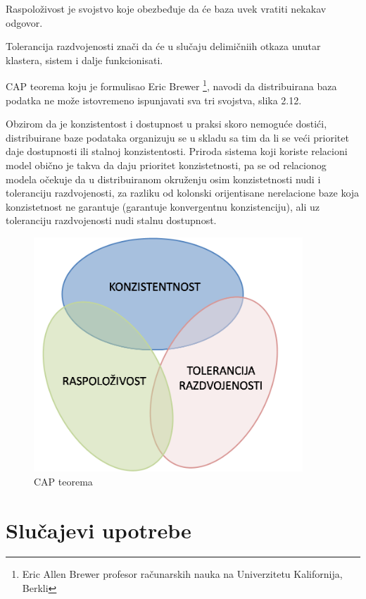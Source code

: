 \documentclass[12pt,oneside]{memoir}
\begin{document}
Raspoloživost je svojstvo koje obezbeđuje da će baza uvek vratiti nekakav odgovor.

Tolerancija razdvojenosti znači da će u slučaju delimičniih otkaza unutar klastera, sistem i dalje funkcionisati.

CAP teorema koju je formulisao Eric Brewer  \footnote{Eric Allen Brewer profesor računarskih nauka na Univerzitetu Kalifornija, Berkli}, navodi da distribuirana baza podatka ne može istovremeno ispunjavati sva tri svojstva, slika 2.12.

Obzirom da je konzistentost i dostupnost u praksi skoro nemoguće dostići, distribuirane baze podataka organizuju se u skladu sa tim da li se veći prioritet daje dostupnosti ili stalnoj konzistentosti. Priroda sistema koji koriste relacioni model obično je takva da  daju prioritet konzistetnosti, pa se od relacionog modela očekuje da u distribuiranom okruženju osim konzistetnosti nudi i toleranciju razdvojenosti, za razliku od kolonski orijentisane nerelacione baze koja konzistetnost ne garantuje (garantuje konvergentnu konzistenciju), ali uz toleranciju razdvojenosti nudi stalnu dostupnost.

\begin{figure}[!ht]
  \centering
  \includegraphics[width=0.9\textwidth]{cap.png}
  \caption{CAP teorema}
  \label{fig:grafikon}
\end{figure}

\chapter{Slučajevi upotrebe}
\end{document}
